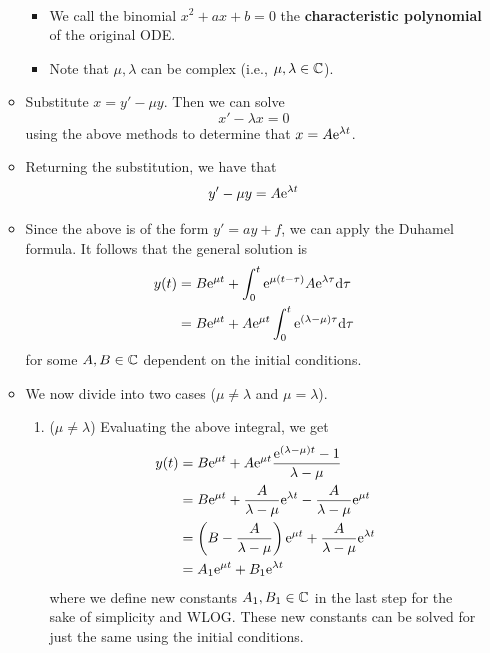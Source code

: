 \documentclass[../notes.tex]{subfiles}
\begin{document}
\begin{itemize}
\begin{itemize}
\begin{align*}
        \end{align*}
        \begin{itemize}
            \item We call the binomial $x^2+ax+b=0$ the \textbf{characteristic polynomial} of the original ODE.
            \item Note that $\mu,\lambda$ can be complex (i.e., $\mu,\lambda\in\C$).
        \end{itemize}
        \item Substitute $x=y'-\mu y$. Then we can solve
        \begin{equation*}
            x'-\lambda x = 0
        \end{equation*}
        using the above methods to determine that $x=A\e[\lambda t]$.
        \item Returning the substitution, we have that
        \begin{equation*}
            y'-\mu y = A\e[\lambda t]
        \end{equation*}
        \item Since the above is of the form $y'=ay+f$, we can apply the Duhamel formula. It follows that the general solution is
        \begin{align*}
            y(t) &= B\e[\mu t]+\int_0^t\e[\mu(t-\tau)]A\e[\lambda\tau]\dd\tau\\
            &= B\e[\mu t]+A\e[\mu t]\int_0^t\e[(\lambda-\mu)\tau]\dd\tau
        \end{align*}
        for some $A,B\in\C$ dependent on the initial conditions.
        \item We now divide into two cases ($\mu\neq\lambda$ and $\mu=\lambda$).
        \begin{enumerate}
            \item ($\mu\neq\lambda$) Evaluating the above integral, we get
            \begin{align*}
                y(t) &= B\e[\mu t]+A\e[\mu t]\frac{\e[(\lambda-\mu)t]-1}{\lambda-\mu}\\
                &= B\e[\mu t]+\frac{A}{\lambda-\mu}\e[\lambda t]-\frac{A}{\lambda-\mu}\e[\mu t]\\
                &= \left( B-\frac{A}{\lambda-\mu} \right)\e[\mu t]+\frac{A}{\lambda-\mu}\e[\lambda t]\\
                &= A_1\e[\mu t]+B_1\e[\lambda t]
            \end{align*}
            where we define new constants $A_1,B_1\in\C$ in the last step for the sake of simplicity and WLOG. These new constants can be solved for just the same using the initial conditions.

\end{enumerate}
\end{itemize}
\end{itemize}
\end{document}
